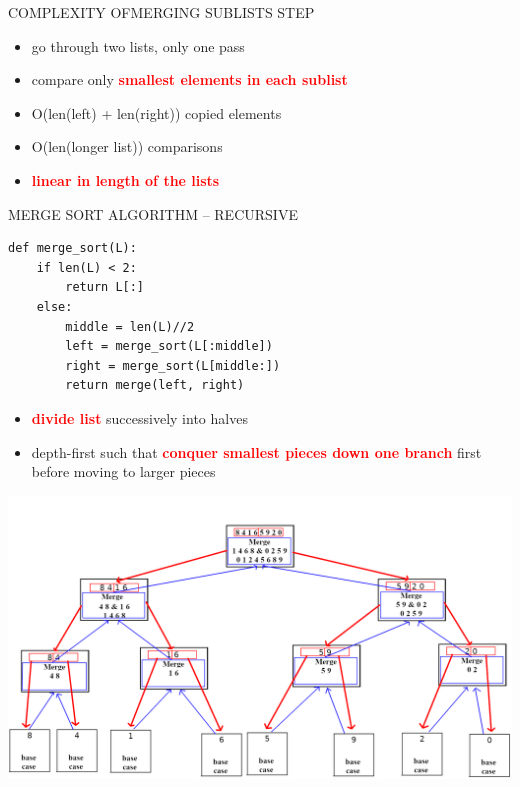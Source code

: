 \documentclass[aspectratio=169]{beamer}
\begin{document}
\begin{frame}{COMPLEXITY OFMERGING SUBLISTS STEP}
\begin{itemize}
\item go through two lists, only one pass
\item compare only \textcolor{red}{\textbf{smallest elements in each sublist}}
\item O(len(left) + len(right)) copied elements
\item O(len(longer list)) comparisons
\item \textcolor{red}{\textbf{linear in length of the lists}}
\end{itemize}
\end{frame}

\begin{frame}[fragile]{MERGE SORT ALGORITHM -- RECURSIVE}
\begin{lstlisting}
def merge_sort(L):
	if len(L) < 2:
		return L[:]
	else:
		middle = len(L)//2
		left = merge_sort(L[:middle])
		right = merge_sort(L[middle:])
		return merge(left, right)
\end{lstlisting}
\begin{itemize}
\item \textcolor{red}{\textbf{divide list}} successively into halves
\item depth-first such that \textcolor{red}{\textbf{conquer smallest pieces down one branch}} first before moving to larger pieces
\end{itemize}
\end{frame}

\begin{frame}
\begin{center}
\includegraphics[scale=0.8]{graphics/merge_sort_dia.png}
\end{center}
\end{frame}
\end{document}
